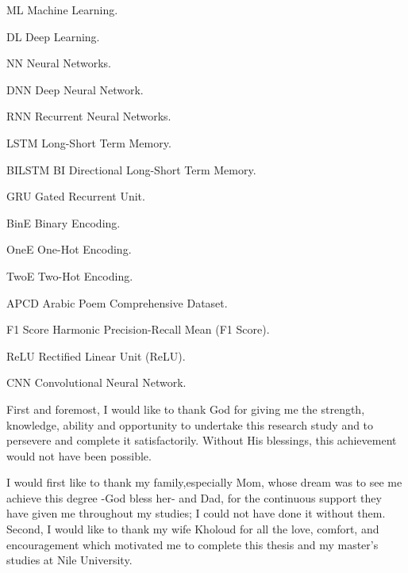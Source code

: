 

\newpage
{}

\begin{abbreviations}
	\item[ML] Machine Learning.
	\item[DL] Deep Learning.  
	\item[NN] Neural Networks. 
	\item[DNN] Deep Neural Network.  
	\item[RNN]  Recurrent Neural Networks. 
	\item[LSTM] Long-Short Term Memory. 
	\item[BILSTM] BI Directional Long-Short Term Memory. 
	\item[GRU] Gated Recurrent Unit. 
	\item[BinE] Binary Encoding.
	\item[OneE] One-Hot Encoding. 
	\item[TwoE] Two-Hot Encoding.
	\item[APCD] Arabic Poem Comprehensive Dataset.
	\item[F1 Score] Harmonic Precision-Recall Mean (F1 Score).
	\item[ReLU] Rectified Linear Unit (ReLU).
	\item[CNN]	Convolutional Neural Network.
	
	
	
\end{abbreviations}


\newpage
{}

First and foremost, I would like to thank God for giving me the strength, knowledge, ability and opportunity to undertake this research study and to persevere and complete it satisfactorily. Without His blessings, this achievement would not have been possible. 

I would first like to thank my family,especially Mom, whose dream was to see me achieve this degree -God bless her- and Dad, for the continuous support they have given me throughout my studies; I could not have done it without them. Second, I would like to thank my wife Kholoud for all the love, comfort, and encouragement which motivated me to complete this thesis and my master’s studies at Nile University. 

